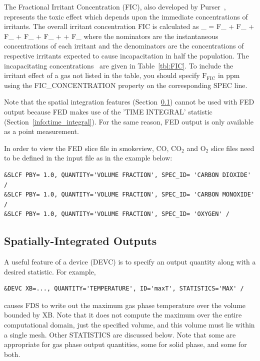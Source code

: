 \documentclass[11pt]{book}
\begin{document}
The Fractional Irritant Concentration (FIC), also developed by Purser~\cite{SFPE:Purser}, represents the toxic effect which
depends upon the immediate concentrations of irritants. The overall irritant concentration FIC is calculated as
\be
{}_ =
        {F_} +
        {F_} +
         {F_} +
       {F_} +
       {F_} +
     +
      {F_}
\ee
where the nominators are the instantaneous concentrations of each irritant and the denominators are the concentrations of respective irritants
expected to cause incapacitation in half the population. The incapacitating concentrations~\cite{SFPE:Purser} are given in Table~\ref{tbl:FIC}.
To include the irritant effect of a gas not listed in the table, you should specify $\mathrm{F_{FIC}}$ in ppm using the {\ct FIC\_CONCENTRATION}
property on the corresponding {\ct SPEC} line.

Note that the spatial integration features (Section~\ref{info:statistics}) cannot be used with FED output because FED makes
use of the {\ct 'TIME INTEGRAL'} statistic (Section~\ref{info:time_integral}). For the same reason, FED output is only available as a point measurement.

In order to view the FED slice file in smokeview, CO, CO${}_2$ and O${}_2$ slice files need to be defined in the input file as in the example below:

\begin{lstlisting}
&SLCF PBY= 1.0, QUANTITY='VOLUME FRACTION', SPEC_ID= 'CARBON DIOXIDE' /
&SLCF PBY= 1.0, QUANTITY='VOLUME FRACTION', SPEC_ID= 'CARBON MONOXIDE' /
&SLCF PBY= 1.0, QUANTITY='VOLUME FRACTION', SPEC_ID= 'OXYGEN' /
\end{lstlisting}


\subsection{Spatially-Integrated Outputs}
\label{info:statistics}

A useful feature of a device ({\ct DEVC}) is to specify an output quantity along with a desired statistic. For example,
\begin{lstlisting}
&DEVC XB=..., QUANTITY='TEMPERATURE', ID='maxT', STATISTICS='MAX' /
\end{lstlisting}
causes FDS to write out the maximum gas phase temperature over the volume bounded by {\ct XB}. Note that it does not compute the maximum over the entire computational domain, just the specified volume, and this volume must lie within a single mesh. Other {\ct STATISTICS} are discussed below.  Note that some are appropriate for gas phase output quantities, some for solid phase, and some for both.
\end{document}
